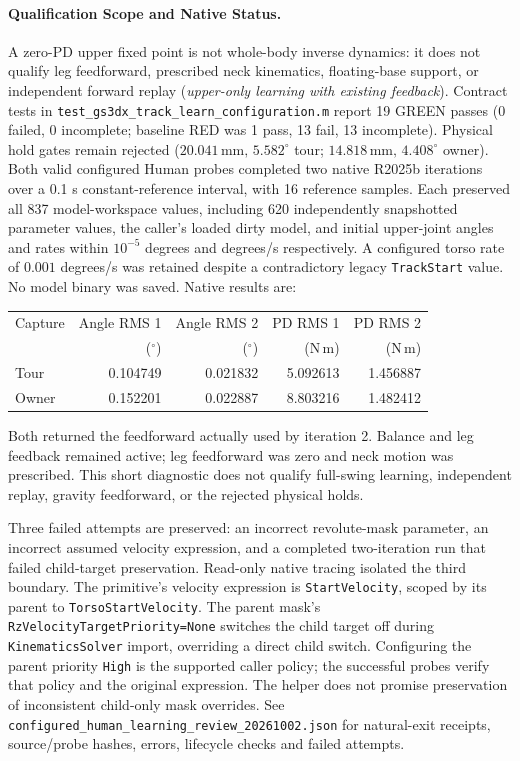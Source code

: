 \documentclass[11pt,a4paper]{article}
\begin{document}
\paragraph{Qualification Scope and Native Status.}
A zero-PD upper fixed point is not whole-body inverse dynamics: it does not qualify leg feedforward, prescribed neck kinematics, floating-base support, or independent forward replay (\emph{upper-only learning with existing feedback}). Contract tests in \texttt{test\_gs3dx\_track\_learn\_configuration.m} report 19 GREEN passes (0 failed, 0 incomplete; baseline RED was 1 pass, 13 fail, 13 incomplete). Physical hold gates remain rejected ($20.041\,\mathrm{mm},\,5.582^\circ$ tour; $14.818\,\mathrm{mm},\,4.408^\circ$ owner). Both valid configured Human probes completed two native R2025b
iterations over a 0.1 s constant-reference interval, with 16 reference
samples. Each preserved all 837 model-workspace values, including 620
independently snapshotted parameter values, the caller's loaded dirty model,
and initial upper-joint angles and rates within $10^{-5}$ degrees and
degrees/s respectively. A configured torso rate of $0.001$ degrees/s was
retained despite a contradictory legacy \texttt{TrackStart} value. No model
binary was saved. Native results are:
\begin{center}
\begin{tabular}{lrrrr}
\toprule
Capture & Angle RMS 1 & Angle RMS 2 & PD RMS 1 & PD RMS 2 \\
 & ($^\circ$) & ($^\circ$) & (N\,m) & (N\,m) \\
\midrule
Tour & 0.104749 & 0.021832 & 5.092613 & 1.456887 \\
Owner & 0.152201 & 0.022887 & 8.803216 & 1.482412 \\
\bottomrule
\end{tabular}
\end{center}
Both returned the feedforward actually used by iteration 2. Balance and leg
feedback remained active; leg feedforward was zero and neck motion was
prescribed. This short diagnostic does not qualify full-swing learning,
independent replay, gravity feedforward, or the rejected physical holds.

Three failed attempts are preserved: an incorrect revolute-mask parameter,
an incorrect assumed velocity expression, and a completed two-iteration
run that failed child-target preservation. Read-only native tracing isolated
the third boundary. The primitive's velocity expression is
\texttt{StartVelocity}, scoped by its parent to
\texttt{TorsoStartVelocity}. The parent mask's
\texttt{RzVelocityTargetPriority=None} switches the child target off during
\texttt{KinematicsSolver} import, overriding a direct child switch.
Configuring the parent priority \texttt{High} is the supported caller policy;
the successful probes verify that policy and the original expression.
The helper does not promise preservation of inconsistent child-only mask
overrides. See
\texttt{configured\_human\_learning\_review\_20261002.json} for natural-exit
receipts, source/probe hashes, errors, lifecycle checks and failed attempts.
\end{document}
